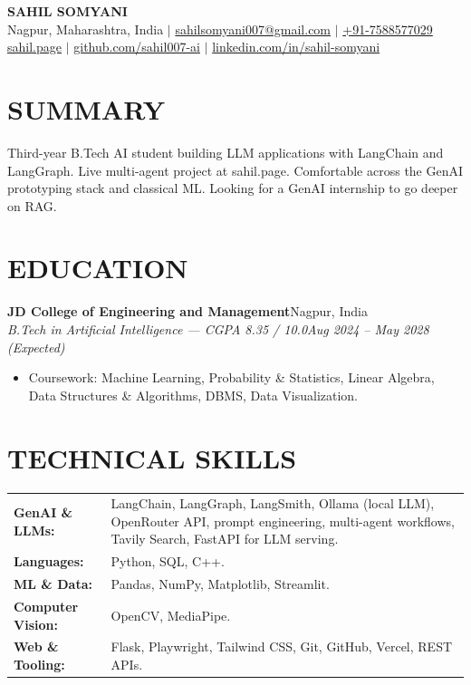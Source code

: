 \documentclass[10pt,letterpaper]{article}
\newenvironment{bul}
  {\begin{itemize}[leftmargin=1.15em,labelsep=0.4em,label=\textbullet,
                   itemsep=0pt,topsep=1pt,parsep=0pt,partopsep=0pt]}
  {\end{itemize}}
\begin{document}
\begin{center}
  {\fontsize{24}{28}\selectfont\bfseries SAHIL SOMYANI}\\[3pt]
  {\small
  Nagpur, Maharashtra, India \enspace$\vert$\enspace
  \href{mailto:sahilsomyani007@gmail.com}{sahilsomyani007@gmail.com}
  \enspace$\vert$\enspace
  \href{tel:+917588577029}{+91-7588577029}\\
  \href{https://sahil.page}{sahil.page} \enspace$\vert$\enspace
  \href{https://github.com/sahil007-ai}{github.com/sahil007-ai} \enspace$\vert$\enspace
  \href{https://www.linkedin.com/in/sahil-somyani-637270319/}{linkedin.com/in/sahil-somyani}}
\end{center}
\vspace{-6pt}

\section{SUMMARY}
Third-year B.Tech AI student building LLM applications with LangChain and LangGraph. Live multi-agent project at sahil.page. Comfortable across the GenAI prototyping stack and classical ML. Looking for a GenAI internship to go deeper on RAG.

\section{EDUCATION}
\noindent\textbf{JD College of Engineering and Management}\hfill{\small Nagpur, India}\\
\textit{B.Tech in Artificial Intelligence --- CGPA 8.35 / 10.0}\hfill{\small\textit{Aug 2024 -- May 2028 (Expected)}}
\begin{bul}
  \item Coursework: Machine Learning, Probability \& Statistics, Linear Algebra, Data Structures \& Algorithms, DBMS, Data Visualization.
\end{bul}

\section{TECHNICAL SKILLS}
\vspace{1pt}
\begin{tabularx}{\textwidth}{@{}>{\bfseries}p{1.28in}>{\raggedright\arraybackslash}X@{}}
  GenAI \& LLMs: & LangChain, LangGraph, LangSmith, Ollama (local LLM), OpenRouter API, prompt engineering, multi-agent workflows, Tavily Search, FastAPI for LLM serving. \\
  Languages: & Python, SQL, C++. \\
  ML \& Data: & Pandas, NumPy, Matplotlib, Streamlit. \\
  Computer Vision: & OpenCV, MediaPipe. \\
  Web \& Tooling: & Flask, Playwright, Tailwind CSS, Git, GitHub, Vercel, REST APIs. \\
\end{tabularx}
\end{document}
